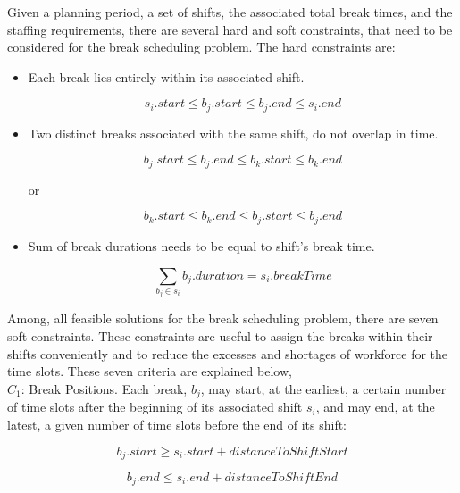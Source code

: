 Given a planning period, a set of shifts, the associated total break times, and the staffing requirements, there are several hard and soft constraints, that need to be considered for the break scheduling problem. The hard constraints are:
\begin{itemize}
\item Each break lies entirely within its associated shift.

\begin{equation}
s_i.start \le b_j.start \le b_j.end \le s_i.end
\end{equation}

\item Two distinct breaks associated with the same shift, do not overlap in time. 

\begin{equation}
 b_j.start \le b_j.end \le  b_k.start \le b_k.end 
\end{equation}

or

\begin{equation}
 b_k.start \le b_k.end \le  b_j.start \le b_j.end 
\end{equation}

\item Sum of break durations needs to be equal to shift's break time. 

\begin{equation}
\sum_{b_j \in s_i} b_j.duration = s_i.breakTime
\end{equation}


\end{itemize}

Among, all feasible solutions for the break scheduling problem, there are seven soft constraints. These constraints are useful to assign the breaks within their shifts conveniently and to reduce the excesses and shortages of workforce for the time slots. These seven criteria are explained below, \\

$C_1$: Break Positions. Each break, $b_j$, may start, at the earliest, a certain number of time slots after the beginning of its associated shift $s_i$, and may end, at the latest, a given number of time slots before the end of its shift:

\begin{equation}
b_j.start \ge s_i.start + distanceToShiftStart
\end{equation}

\begin{equation}
b_j.end \le s_i.end + distanceToShiftEnd
\end{equation}


